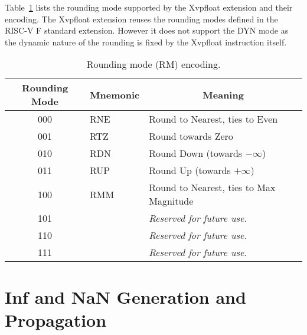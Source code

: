 Table~\ref{rm} lists the rounding mode supported by the Xvpfloat extension and their encoding.
The Xvpfloat extension reuses the rounding modes defined in the RISC-V F standard extension.
However it does not support the DYN mode as the dynamic nature of the rounding is fixed by the Xvpfloat instruction itself.

\begin{table}[htbp]
    \begin{small}
    \begin{center}
    \begin{tabular}{ccl}
    \hline
    \multicolumn{1}{|c|}{Rounding Mode} &
    \multicolumn{1}{c|}{Mnemonic} &
    \multicolumn{1}{c|}{Meaning} \\
    \hline
    \multicolumn{1}{|c|}{000} &
    \multicolumn{1}{l|}{RNE} &
    \multicolumn{1}{l|}{Round to Nearest, ties to Even}\\
    \hline
    \multicolumn{1}{|c|}{001} &
    \multicolumn{1}{l|}{RTZ} &
    \multicolumn{1}{l|}{Round towards Zero}\\
    \hline
    \multicolumn{1}{|c|}{010} &
    \multicolumn{1}{l|}{RDN} &
    \multicolumn{1}{l|}{Round Down (towards $-\infty$)}\\
    \hline
    \multicolumn{1}{|c|}{011} &
    \multicolumn{1}{l|}{RUP} &
    \multicolumn{1}{l|}{Round Up (towards $+\infty$)}\\
    \hline
    \multicolumn{1}{|c|}{100} &
    \multicolumn{1}{l|}{RMM} &
    \multicolumn{1}{l|}{Round to Nearest, ties to Max Magnitude}\\
    \hline
    \multicolumn{1}{|c|}{101} &
    \multicolumn{1}{l|}{} &
    \multicolumn{1}{l|}{\em Reserved for future use.}\\
    \hline
    \multicolumn{1}{|c|}{110} &
    \multicolumn{1}{l|}{} &
    \multicolumn{1}{l|}{\em Reserved for future use.}\\
    \hline
    \multicolumn{1}{|c|}{111} &
    \multicolumn{1}{l|}{} &
    \multicolumn{1}{l|}{\em Reserved for future use.}\\
    \hline
    \end{tabular}
    \end{center}
    \end{small}
    \caption{Rounding mode (RM) encoding.}
    \label{rm}
\end{table}

\section{Inf and NaN Generation and Propagation}

